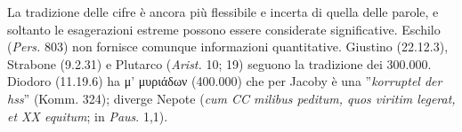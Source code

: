 {La tradizione delle cifre è ancora più flessibile e incerta di quella delle parole, e soltanto le esagerazioni estreme possono essere considerate significative. Eschilo (\emph{Pers.} 803) non fornisce comunque informazioni quantitative.  Giustino (22.12.3), Strabone (9.2.31) e Plutarco (\emph{Arist. }10; 19) seguono la  tradizione dei 300.000.  Diodoro (11.19.6) ha \textgreek{μ' μυριάδων} (400.000) che per Jacoby è una ''\emph{korruptel der hss}'' (Komm. 324); diverge  Nepote (\emph{cum CC milibus peditum, quos viritim legerat, et XX equitum}; in \emph{Paus}. 1,1).
}
